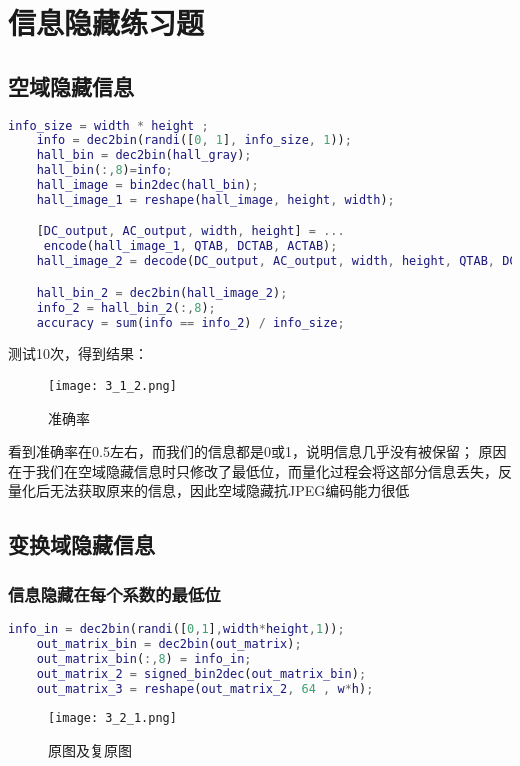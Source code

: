 \documentclass[12pt]{article}
\begin{document}
\section{信息隐藏练习题}
\subsection{空域隐藏信息}

\begin{lstlisting}[language=matlab]
    info_size = width * height ;
    info = dec2bin(randi([0, 1], info_size, 1));
    hall_bin = dec2bin(hall_gray);
    hall_bin(:,8)=info;
    hall_image = bin2dec(hall_bin);
    hall_image_1 = reshape(hall_image, height, width);

    [DC_output, AC_output, width, height] = ... 
     encode(hall_image_1, QTAB, DCTAB, ACTAB);
    hall_image_2 = decode(DC_output, AC_output, width, height, QTAB, DCTAB, ACTAB);

    hall_bin_2 = dec2bin(hall_image_2);
    info_2 = hall_bin_2(:,8);
    accuracy = sum(info == info_2) / info_size;
\end{lstlisting}

测试10次，得到结果：
\begin{figure}[H]
    \centering
    \texttt{[image: 3\_1\_2.png]}
    \caption{准确率}
\end{figure}
看到准确率在0.5左右，而我们的信息都是0或1，说明信息几乎没有被保留；
\hspace*{2em}原因在于我们在空域隐藏信息时只修改了最低位，而量化过程会将这部分信息丢失，反量化后无法获取原来的信息，因此空域隐藏抗JPEG编码能力很低

\subsection{变换域隐藏信息}
\subsubsection{信息隐藏在每个系数的最低位}

\begin{lstlisting}[language=matlab]
    info_in = dec2bin(randi([0,1],width*height,1));
    out_matrix_bin = dec2bin(out_matrix);
    out_matrix_bin(:,8) = info_in;
    out_matrix_2 = signed_bin2dec(out_matrix_bin);
    out_matrix_3 = reshape(out_matrix_2, 64 , w*h);
\end{lstlisting}
\begin{figure}[H]
    \centering
    \texttt{[image: 3\_2\_1.png]}
    \caption{原图及复原图}
\end{figure}
\end{document}
